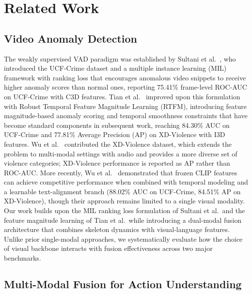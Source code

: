 \documentclass[sigconf]{acmart}
\begin{document}
\section{Related Work}

\subsection{Video Anomaly Detection}

The weakly supervised VAD paradigm was established by Sultani et al.~\cite{sultani2018ucfcrime}, who introduced the UCF-Crime dataset and a multiple instance learning (MIL) framework with ranking loss that encourages anomalous video snippets to receive higher anomaly scores than normal ones, reporting 75.41\% frame-level ROC-AUC on UCF-Crime with C3D features. Tian et al.~\cite{tian2021rtfm} improved upon this formulation with Robust Temporal Feature Magnitude Learning (RTFM), introducing feature magnitude-based anomaly scoring and temporal smoothness constraints that have become standard components in subsequent work, reaching 84.30\% AUC on UCF-Crime and 77.81\% Average Precision (AP) on XD-Violence with I3D features. Wu et al.~\cite{wu2020xdviolence} contributed the XD-Violence dataset, which extends the problem to multi-modal settings with audio and provides a more diverse set of violence categories; XD-Violence performance is reported as AP rather than ROC-AUC. More recently, Wu et al.~\cite{wu2024vadclip} demonstrated that frozen CLIP features can achieve competitive performance when combined with temporal modeling and a learnable text-alignment branch (88.02\% AUC on UCF-Crime, 84.51\% AP on XD-Violence), though their approach remains limited to a single visual modality. Our work builds upon the MIL ranking loss formulation of Sultani et al.\ and the feature magnitude learning of Tian et al.\ while introducing a dual-modal fusion architecture that combines skeleton dynamics with visual-language features. Unlike prior single-modal approaches, we systematically evaluate how the choice of visual backbone interacts with fusion effectiveness across two major benchmarks.

\subsection{Multi-Modal Fusion for Action Understanding}
\end{document}
